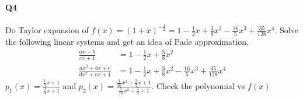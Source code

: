 \documentclass[11pt]{article}
\begin{document}
\begin{figure}[H]
	\centering
\end{figure}
\paragraph{Q4}
Do Taylor expansion of $f(x)=(1+x)^{-\frac{1}{2}}=1-\frac{1}{2}x+\frac{3}{8}x^2-\frac{16}{5}x^3+\frac{35}{128}x^4$. Solve the following linear systems and get an idea of Pade approximation,
\begin{align}
	\frac{ax+b}{cx+1}&=1-\frac{1}{2}x+\frac{3}{8}x^2\\
	\frac{ax^2+bx+c}{dx^2+ex+1}&=1-\frac{1}{2}x+\frac{3}{8}x^2-\frac{16}{5}x^3+\frac{35}{128}x^4
\end{align}
\qquad $p_1(x)=\frac{\frac{1}{4}x+1}{\frac{3}{4}x+1}$ and $p_2(x)=\frac{\frac{1}{16}x^2+\frac{3}{4}x+1}{\frac{5}{16}x^2+\frac{5}{4}+1}$. Check the polynomial vs $f(x)$
\begin{figure}[H]
	\centering
\end{figure}
\end{document}
